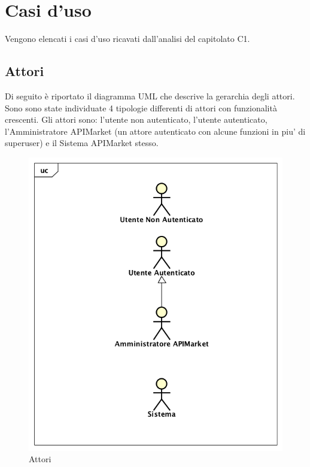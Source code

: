 \newpage
\section{Casi d'uso}
Vengono elencati i casi d'uso ricavati dall'analisi del capitolato C1.

\subsection{Attori}
Di seguito è riportato il diagramma UML che descrive la gerarchia degli attori. Sono sono state individuate 4 tipologie differenti di attori con funzionalità crescenti. Gli attori sono: l'utente non autenticato, l'utente autenticato, l'Amministratore APIMarket (un attore autenticato con alcune funzioni in piu' di superuser) e il Sistema APIMarket stesso.
\label{Attori}

\begin{figure}[ht]
	\centering
	\includegraphics[scale=0.45]{UML/attori.png}
	\caption{Attori}
\end{figure}


